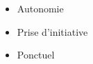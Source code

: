 %
%
%

\twocolumnsection
{
\begin{skills}
\end{skills}}
{
\vspace{1em}
\begin{itemize}
	\item Autonomie                       
    \item Prise d'initiative                    
    \item Ponctuel                                                                  
\end{itemize}
}
